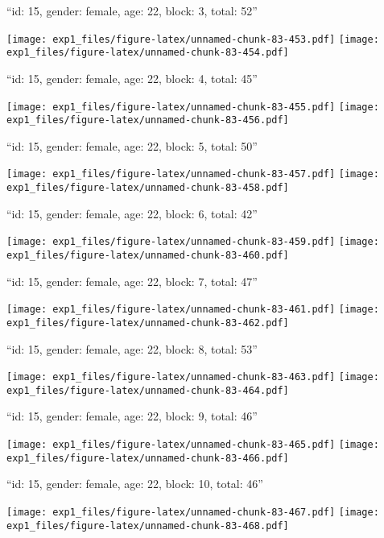 \documentclass[11pt,,]{article}
\begin{document}
\newpage
[1] 

``id: 15, gender: female, age: 22, block: 3, total: 52''

\texttt{[image: exp1\_files/figure-latex/unnamed-chunk-83-453.pdf]}
\texttt{[image: exp1\_files/figure-latex/unnamed-chunk-83-454.pdf]}

\newpage
[1] 

``id: 15, gender: female, age: 22, block: 4, total: 45''

\texttt{[image: exp1\_files/figure-latex/unnamed-chunk-83-455.pdf]}
\texttt{[image: exp1\_files/figure-latex/unnamed-chunk-83-456.pdf]}

\newpage
[1] 

``id: 15, gender: female, age: 22, block: 5, total: 50''

\texttt{[image: exp1\_files/figure-latex/unnamed-chunk-83-457.pdf]}
\texttt{[image: exp1\_files/figure-latex/unnamed-chunk-83-458.pdf]}

\newpage
[1] 

``id: 15, gender: female, age: 22, block: 6, total: 42''

\texttt{[image: exp1\_files/figure-latex/unnamed-chunk-83-459.pdf]}
\texttt{[image: exp1\_files/figure-latex/unnamed-chunk-83-460.pdf]}

\newpage
[1] 

``id: 15, gender: female, age: 22, block: 7, total: 47''

\texttt{[image: exp1\_files/figure-latex/unnamed-chunk-83-461.pdf]}
\texttt{[image: exp1\_files/figure-latex/unnamed-chunk-83-462.pdf]}

\newpage
[1] 

``id: 15, gender: female, age: 22, block: 8, total: 53''

\texttt{[image: exp1\_files/figure-latex/unnamed-chunk-83-463.pdf]}
\texttt{[image: exp1\_files/figure-latex/unnamed-chunk-83-464.pdf]}

\newpage
[1] 

``id: 15, gender: female, age: 22, block: 9, total: 46''

\texttt{[image: exp1\_files/figure-latex/unnamed-chunk-83-465.pdf]}
\texttt{[image: exp1\_files/figure-latex/unnamed-chunk-83-466.pdf]}

\newpage
[1] 

``id: 15, gender: female, age: 22, block: 10, total: 46''

\texttt{[image: exp1\_files/figure-latex/unnamed-chunk-83-467.pdf]}
\texttt{[image: exp1\_files/figure-latex/unnamed-chunk-83-468.pdf]}
\end{document}
